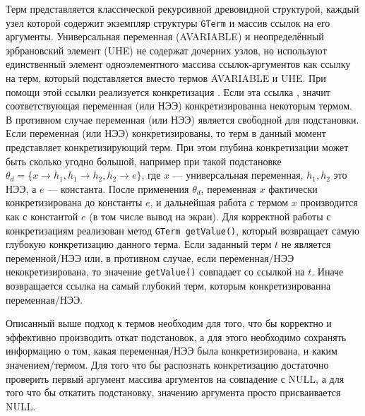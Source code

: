 Терм представляется классической рекурсивной древовидной структурой, каждый узел которой содержит экземпляр структуры \texttt{GTerm}  и массив ссылок на его аргументы. Универсальная переменная (AVARIABLE) и неопределённый эрбрановский элемент (UHE) не содержат дочерних узлов, но используют единственный элемент одноэлементного массива ссылок-аргументов как ссылку на терм, который подставляется вместо термов AVARIABLE и UHE. При помощи этой ссылки реализуется конкретизация . Если эта ссылка , значит соответствующая переменная (или НЭЭ) конкретизированна некоторым термом. В противном случае переменная (или НЭЭ) является свободной для подстановки. Если переменная (или НЭЭ) конкретизированы, то терм  в данный момент представляет конкретизирующий терм. При этом глубина конкретизации может быть сколько угодно большой, например при такой подстановке ${\theta}_d = \{x \rightarrow h_1, h_1 \rightarrow h_2, h_2 \rightarrow e \}$, где $x$ --- универсальная переменная, $h_1, h_2$ это НЭЭ, а $e$ --- константа. После применения ${\theta}_d$, переменная $x$ фактически конкретизирована до константы $e$, и дальнейшая работа с термом $x$ производится как с константой $e$ (в том числе вывод на экран). Для корректной работы с конкретизациям реализован метод {\tt GTerm getValue()}, который возвращает самую глубокую конкретизацию данного терма. Если заданный терм $t$ не является переменной/НЭЭ или, в противном случае, если переменная/НЭЭ некокретизирована, то значение \texttt{getValue()} совпадает со ссылкой на $t$. Иначе возвращается ссылка на самый глубокий терм, которым конкретизированна переменная/НЭЭ.

Описанный выше подход к  термов необходим для того, что бы корректно и эффективно производить откат подстановок, а для этого необходимо сохранять информацию о том, какая переменная/НЭЭ была конкретизирована, и каким значением/термом. Для того что бы распознать конкретизацию достаточно проверить первый аргумент массива аргументов на совпадение с NULL, а для того что бы откатить подстановку, значению аргумента просто присваивается NULL.

